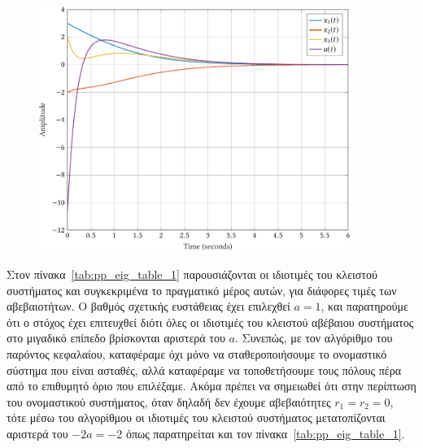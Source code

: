 \begin{figure}[h]
    \centering
    \includegraphics[width=0.9\textwidth]{figures/pp_ex3.pdf}
    \label{fig:pp_ex3}
\end{figure}

Στον πίνακα~\ref{tab:pp_eig_table_1} παρουσιάζονται οι ιδιοτιμές του κλειστού
συστήματος και συγκεκριμένα το πραγματικό μέρος αυτών, για διάφορες τιμές των
αβεβαιοτήτων. Ο βαθμός σχετικής ευστάθειας έχει επιλεχθεί \( a = 1 \), και
παρατηρούμε ότι ο στόχος έχει επιτευχθεί διότι όλες οι ιδιοτιμές του κλειστού
αβέβαιου συστήματος στο μιγαδικό επίπεδο βρίσκονται αριστερά του \( a \).
Συνεπώς, με τον αλγόριθμο του παρόντος κεφαλαίου, καταφέραμε όχι μόνο να
σταθεροποιήσουμε το ονομαστικό σύστημα που είναι ασταθές, αλλά καταφέραμε να
τοποθετήσουμε τους πόλους πέρα από το επιθυμητό όριο που επιλέξαμε. Ακόμα
πρέπει να σημειωθεί ότι στην περίπτωση του ονομαστικού συστήματος, όταν δηλαδή
δεν έχουμε αβεβαιότητες \( r_1 = r_2 = 0 \), τότε μέσω του αλγορίθμου οι
ιδιοτιμές του κλειστού συστήματος μετατοπίζονται αριστερά του \( -2a = -2 \)
όπως παρατηρείται και τον πίνακα~\ref{tab:pp_eig_table_1}.
\begin{table}[h]
    \centering
    \eng{\[
            \begin{tabu}{ c | c | c | c | c | c | c}
                {} & r_1 = r_2 = 0 & r_1 = r_2 = -1 & r_1 = r_2 = 1
                & r_1 = 1, r_2 = -1 & r_1 = 0, r_2 = -1 & r_1 = 1, r_2 = 0 \\
                \hline
                \lambda_1 & -2.6622 & -5.3094 & -1.2506 & -5.866 & -5.6079 &
                -1.3281 \\
                \lambda_2 & -3 & -1.2914 & -2.3208 & -1.0131 & -1.1421 &
                -1.3281 \\
                \lambda_3 & -4.1358 & -1.2914 & -2.3208 & -1.0131 & -1.1421 &
                -4.236 \\
            \end{tabu}
    \]}
    \label{tab:pp_eig_table_1}
\end{table}

